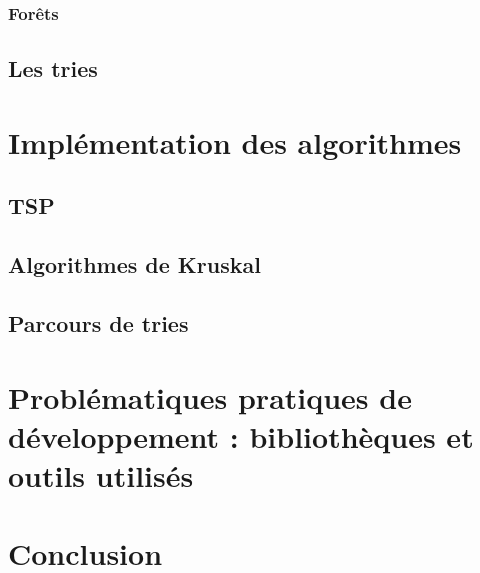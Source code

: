 \documentclass[a4paper]{article}
\begin{document}
\subsubsection{Forêts}

\subsection{Les tries}

\section{Implémentation des algorithmes}

\subsection{TSP}

\subsection{Algorithmes de Kruskal}

\subsection{Parcours de tries}

\section{Problématiques pratiques de développement : bibliothèques et outils utilisés}


\section*{Conclusion}
\end{document}
